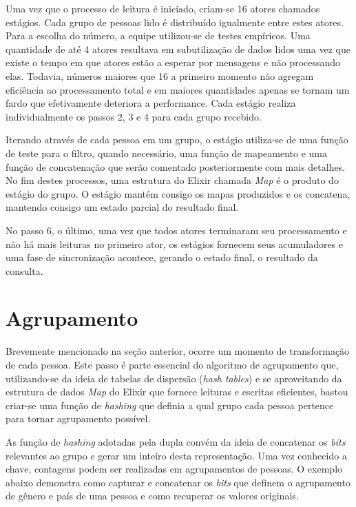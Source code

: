 \documentclass[12pt]{article}
\begin{document}
Uma vez que o processo de leitura é iniciado, criam-se 16 atores chamados estágios. 
Cada grupo de pessoas lido é distribuído igualmente entre estes atores. Para a escolha do número,
a equipe utilizou-se de testes empíricos. Uma quantidade de até 4 atores resultava em subutilização de
dados lidos uma vez que existe o tempo em que atores estão a esperar por mensagens e não processando elas.
Todavia, números maiores que 16 a primeiro momento não agregam eficiência ao processamento total e em
maiores quantidades apenas se tornam um fardo que efetivamente deteriora a performance. Cada estágio realiza
individualmente os passos 2, 3 e 4 para cada grupo recebido.

Iterando através de cada pessoa em um grupo, o estágio utiliza-se de uma função de teste para o filtro, quando
necessário, uma função de mapeamento e uma função de concatenação que serão comentado posteriormente com mais
detalhes. No fim destes processos, uma estrutura do Elixir chamada \textit{Map} é o produto do estágio do grupo.
O estágio mantém consigo os mapas produzidos e os concatena, mantendo consigo um estado parcial do resultado final.

No passo 6, o último, uma vez que todos atores terminaram seu processamento e não há mais leituras no primeiro ator,
os estágios fornecem seus acumuladores e uma fase de sincronização acontece, gerando o estado final, o resultado da
consulta.

\section{Agrupamento}

Brevemente mencionado na seção anterior, ocorre um momento de transformação de cada pessoa. Este passo é parte
essencial do algoritmo de agrupamento que, utilizando-se da ideia de tabelas de dispersão (\textit{hash tables}) e
se aproveitando da estrutura de dados \textit{Map} do Elixir que fornece leituras e escritas eficientes, bastou
criar-se uma função de \textit{hashing} que definia a qual grupo cada pessoa pertence para tornar agrupamento possível.

As função de \textit{hashing} adotadas pela dupla convém da ideia de concatenar os \textit{bits} relevantes ao
grupo e gerar um inteiro desta representação. Uma vez conhecido a chave, contagens podem ser realizadas em agrupamentos
de pessoas. O exemplo abaixo demonstra como capturar e concatenar os \textit{bits} que definem o agrupamento 
de gênero e país de uma pessoa e como recuperar os valores originais.
\end{document}
